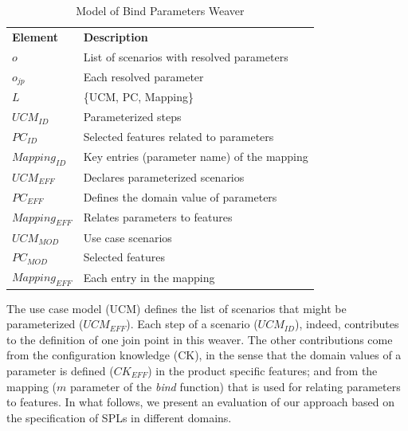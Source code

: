 \documentclass{report}
\begin{document}
\begin{frontmatter}
{\begin{table}[th]
\begin{center}
\nocaptionrule \caption{Model of Bind Parameters Weaver} \label{tab:bp-weaver}
\begin{tabular}{p{0.7in}p{2.3in}}
   \hline\noalign{\smallskip}
  {\bf Element} & {\bf Description} \\
   \noalign{\smallskip}
   \hline
   \noalign{\smallskip}
   $o$               & List of scenarios with resolved parameters  \\ 
   $o_{jp}$        & Each resolved parameter \\ 
   $L$               & \{UCM, PC, Mapping\} \\ 
   $UCM_{ID}$ & Parameterized steps \\
   $PC_{ID}$    & Selected features related to parameters \\ 
   $Mapping_{ID}$ & Key entries (parameter name) of the mapping\\
   $UCM_{EFF}$ & Declares parameterized scenarios \\
   $PC_{EFF}$    & Defines the domain value of parameters \\ 
   $Mapping_{EFF}$ & Relates parameters to features \\
   $UCM_{MOD}$ & Use case scenarios \\
   $PC_{MOD}$    & Selected features \\ 
   $Mapping_{EFF}$ & Each entry in the mapping \\
  \hline
  \end{tabular}
\end{center}
\end{table}

The use case model (UCM) defines the list of scenarios that might be parameterized ($UCM_{EFF}$). Each step of a scenario ($UCM_{ID}$), indeed, contributes to the definition of one join point in this weaver. The 
other contributions come from the configuration knowledge (CK), in the sense that the domain values 
of a parameter is defined ($CK_{EFF}$) in the product specific features; and from the mapping ($m$ parameter of the \emph{bind} function) that is used for relating parameters to features. In what follows, we present an evaluation of our approach based on the specification of SPLs in different domains. 




}
\end{frontmatter}
\end{document}
